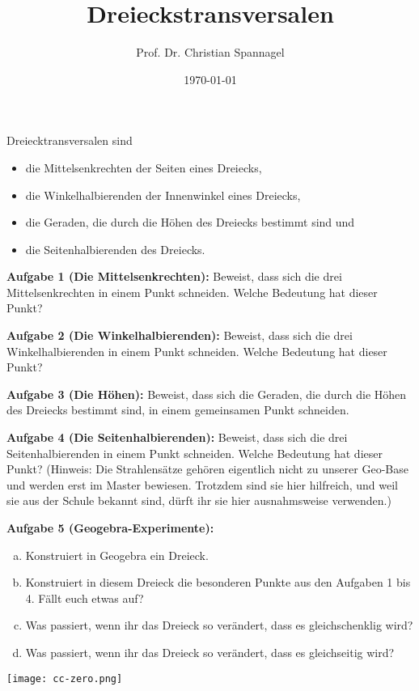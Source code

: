\documentclass[12pt,a4paper,oneside,ngerman]{article}
\title{Dreieckstransversalen}
\author{Prof. Dr. Christian Spannagel}
\date{\today}
\begin{document}
\pagestyle{fancy}
\begin{center}
{\LARGE\textbf{\thetitle}}
\end{center}

Dreiecktransversalen sind
\begin{itemize}
\item die Mittelsenkrechten der Seiten eines Dreiecks,
\item die Winkelhalbierenden der Innenwinkel eines Dreiecks,
\item die Geraden, die durch die Höhen des Dreiecks bestimmt sind und
\item die Seitenhalbierenden des Dreiecks.
\end{itemize}

\textbf{Aufgabe 1 (Die Mittelsenkrechten):}  Beweist, dass sich die drei Mittelsenkrechten in einem Punkt schneiden. Welche Bedeutung hat dieser Punkt?

\textbf{Aufgabe 2 (Die Winkelhalbierenden):}  Beweist, dass sich die drei Winkelhalbierenden in einem Punkt schneiden. Welche Bedeutung hat dieser Punkt?

\textbf{Aufgabe 3 (Die Höhen):}  Beweist, dass sich die Geraden, die durch die Höhen des Dreiecks bestimmt sind, in einem gemeinsamen Punkt schneiden.

\textbf{Aufgabe 4 (Die Seitenhalbierenden):}  Beweist, dass sich die drei Seitenhalbierenden in einem Punkt schneiden. Welche Bedeutung hat dieser Punkt? (Hinweis: Die Strahlensätze gehören eigentlich nicht zu unserer Geo-Base und werden erst im Master bewiesen. Trotzdem sind sie hier hilfreich, und weil sie aus der Schule bekannt sind, dürft ihr sie hier ausnahmsweise verwenden.)

\textbf{Aufgabe 5 (Geogebra-Experimente):} 
\begin{enumerate}[a)]
\item Konstruiert in Geogebra ein Dreieck.
\item Konstruiert in diesem Dreieck die besonderen Punkte aus den Aufgaben 1 bis 4. Fällt euch etwas auf?
\item Was passiert, wenn ihr das Dreieck so verändert, dass es gleichschenklig wird?
\item Was passiert, wenn ihr das Dreieck so verändert, dass es gleichseitig wird?
\end{enumerate}

\newpage
\vspace*{10mm}
\texttt{[image: cc-zero.png]}
\end{document}
